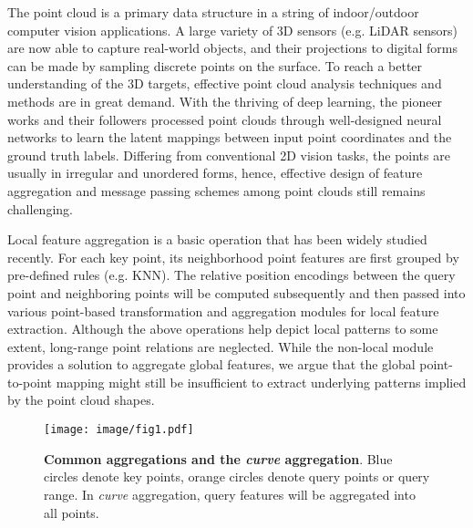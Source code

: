 \documentclass[10pt,twocolumn,letterpaper]{article}
\theoremstyle{definition}
\begin{document}
The point cloud is a primary data structure in a string of indoor/outdoor computer vision applications. A large variety of 3D sensors (e.g. LiDAR sensors) are now able to capture real-world objects, and their projections to digital forms can be made by sampling discrete points on the surface. To reach a better understanding of the 3D targets, effective point cloud analysis techniques and methods are in great demand. With the thriving of deep learning, the pioneer works \cite{qi2017pointnet,qi2017pointnet++} and their followers \cite{liu2020closer,hu2020randla,yan2020pointasnl, bytyqi2020local,xu2020grid,hu2020jsenet,lin2020point2skeleton,SGGpoint} processed point clouds through well-designed neural networks to learn the latent mappings between input point coordinates and the ground truth labels. Differing from conventional 2D vision tasks, the points are usually in irregular and unordered forms, hence, effective design of feature aggregation and message passing schemes among point clouds still remains challenging.

Local feature aggregation is a basic operation that has been widely studied recently. For each key point, its neighborhood point features are first grouped by pre-defined rules (e.g. KNN). The relative position encodings between the query point and neighboring points will be computed subsequently and then passed into various point-based transformation and aggregation modules for local feature extraction. Although the above operations help depict local patterns to some extent, long-range point relations are neglected. While the non-local module \cite{wang2018non} provides a solution to aggregate global features, we argue that the global point-to-point mapping might still be insufficient to extract underlying patterns implied by the point cloud shapes. 



\begin{figure}
	\begin{center}
\texttt{[image: image/fig1.pdf]}
	\end{center}
	\caption{\textbf{Common aggregations and the \textit{curve} aggregation}. Blue circles denote key points, orange circles denote query points or query range. In \textit{curve} aggregation, query features will be aggregated into all points.}
	\label{fig:1}
\end{figure}
\end{document}
